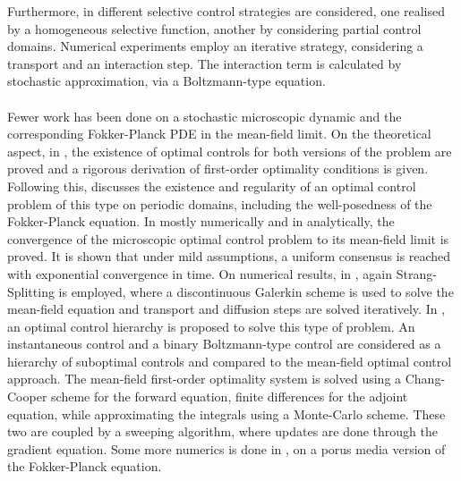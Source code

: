 \documentclass[11pt, a4paper]{article}
\theoremstyle{definition}
\begin{document}
Furthermore, in \cite{albi2016selective} different selective control strategies are considered, one realised by a homogeneous selective function, another by considering partial control domains. Numerical experiments employ an iterative strategy, considering a transport and an interaction step. The interaction term is calculated by stochastic approximation, via a Boltzmann-type equation.
\\
\\
Fewer work has been done on a stochastic microscopic dynamic and the corresponding Fokker-Planck PDE in the mean-field limit. On the theoretical aspect, in \cite{albi2016mean}, the existence of optimal controls for both versions of the problem are proved and a rigorous derivation of first-order optimality conditions is given. 
Following this, \cite{carrillo2019mean} discusses the existence and regularity of an optimal control problem of this type on periodic domains, including the well-posedness of the Fokker-Planck equation. In \cite{carrillo2018no1} mostly numerically and in \cite{Pinnau_2017} analytically, the convergence of the microscopic optimal control problem to its mean-field limit is proved. It is shown that under mild assumptions, a uniform consensus is reached with exponential convergence in time.
On numerical results, in \cite{carrillo2018no1}, again Strang-Splitting is employed, where a discontinuous Galerkin scheme is used to solve the mean-field equation and transport and diffusion steps are solved iteratively. In \cite{albi2016mean}, an optimal control hierarchy is proposed to solve this type of problem. An instantaneous control and a binary Boltzmann-type control are considered as a hierarchy of suboptimal controls and compared to the mean-field optimal control approach. The mean-field first-order optimality system is solved using a Chang-Cooper scheme for the forward equation, finite differences for the adjoint equation, while approximating the integrals using a Monte-Carlo scheme. These two are coupled by a sweeping algorithm, where updates are done through the gradient equation.
Some more numerics is done in \cite{Pinnau_2017}, on a porus media version of the Fokker-Planck equation.
\end{document}
